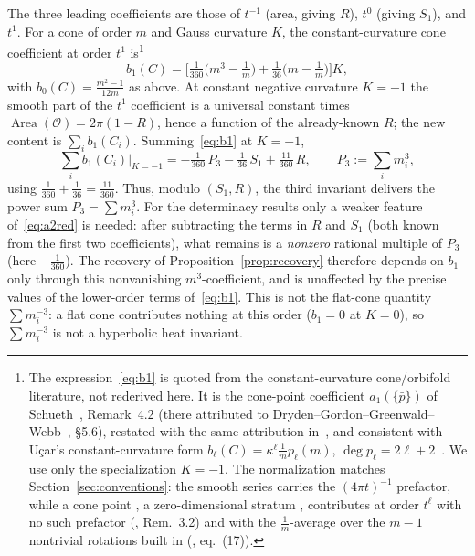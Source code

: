 \documentclass[12pt, letterpaper]{article}
\theoremstyle{definition}
\theoremstyle{plain}
\begin{document}
The three leading coefficients are those of $t^{-1}$ (area, giving $R$), $t^0$ (giving $S_1$), and $t^1$. For a cone of order $m$ and Gauss curvature $K$, the constant-curvature cone coefficient at order $t^1$ is\footnote{The expression~\eqref{eq:b1} is quoted from the constant-curvature cone/orbifold literature, not rederived here. It is the cone-point coefficient $a_1(\{\bar p\})$ of Schueth~\cite{schueth2019}, Remark~4.2 (there attributed to Dryden--Gordon--Greenwald--Webb~\cite{dggw2008}, §5.6), restated with the same attribution in~\cite{schueth2025}, and consistent with U\c{c}ar's constant-curvature form $b_\ell(C)=\kappa^\ell\tfrac1m p_\ell(m)$, $\deg p_\ell=2\ell+2$~\cite{ucar2017}. We use only the specialization $K=-1$. The normalization matches Section~\ref{sec:conventions}: the smooth series carries the $(4\pi t)^{-1}$ prefactor, while a cone point ,  a zero-dimensional stratum ,  contributes at order $t^\ell$ with no such prefactor (\cite{schueth2019}, Rem.~3.2) and with the $\tfrac1m$-average over the $m-1$ nontrivial rotations built in (\cite{schueth2019}, eq.~(17)).}
\begin{equation}
    b_1(C)=\Big[\tfrac1{360}\big(m^3-\tfrac1m\big)+\tfrac1{36}\big(m-\tfrac1m\big)\Big]K,
    \label{eq:b1}
\end{equation}
with $b_0(C)=\tfrac{m^2-1}{12m}$ as above. At constant negative curvature $K=-1$ the smooth part of the $t^1$ coefficient is a universal constant times $\operatorname{Area}(\mathcal{O})=2\pi(1-R)$, hence a function of the already-known $R$; the new content is $\sum_i b_1(C_i)$. Summing~\eqref{eq:b1} at $K=-1$,
\begin{equation}
    \sum_i b_1(C_i)\Big|_{K=-1}=-\tfrac1{360}\,P_3-\tfrac1{36}\,S_1+\tfrac{11}{360}\,R,\qquad P_3:=\sum_i m_i^3,
    \label{eq:a2red}
\end{equation}
using $\tfrac1{360}+\tfrac1{36}=\tfrac{11}{360}$. Thus, modulo $(S_1,R)$, the third invariant delivers the power sum $P_3=\sum m_i^3$. For the determinacy results only a weaker feature of~\eqref{eq:a2red} is needed: after subtracting the terms in $R$ and $S_1$ (both known from the first two coefficients), what remains is a \emph{nonzero} rational multiple of $P_3$ (here $-\tfrac1{360}$). The recovery of Proposition~\ref{prop:recovery} therefore depends on $b_1$ only through this nonvanishing $m^3$-coefficient, and is unaffected by the precise values of the lower-order terms of~\eqref{eq:b1}. This is not the flat-cone quantity $\sum m_i^{-3}$: a flat cone contributes nothing at this order ($b_1=0$ at $K=0$), so $\sum m_i^{-3}$ is not a hyperbolic heat invariant.
\end{document}
